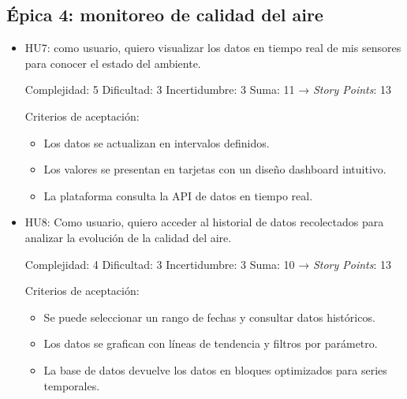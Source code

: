 \documentclass[
11pt, %
]{charter}
\begin{document}
\subsection*{Épica 4: monitoreo de calidad del aire}
\begin{itemize}
	\item HU7: como usuario, quiero visualizar los datos en tiempo real de mis sensores para conocer el estado del ambiente.

	Complejidad: 5
	Dificultad: 3
	Incertidumbre: 3
	Suma: 11 → \textit{Story Points}: 13

	Criterios de aceptación:
	\begin{itemize}
		\item Los datos se actualizan en intervalos definidos.
		\item Los valores se presentan en tarjetas con un diseño dashboard intuitivo.
		\item La plataforma consulta la API de datos en tiempo real.
	\end{itemize}
	\item HU8: Como usuario, quiero acceder al historial de datos recolectados para analizar la evolución de la calidad del aire.

	Complejidad: 4
	Dificultad: 3
	Incertidumbre: 3
	Suma: 10 → \textit{Story Points}: 13

	Criterios de aceptación:
	\begin{itemize}
		\item Se puede seleccionar un rango de fechas y consultar datos históricos.
		\item Los datos se grafican con líneas de tendencia y filtros por parámetro.
		\item La base de datos devuelve los datos en bloques optimizados para series temporales.
	\end{itemize}
\end{itemize}
\end{document}
